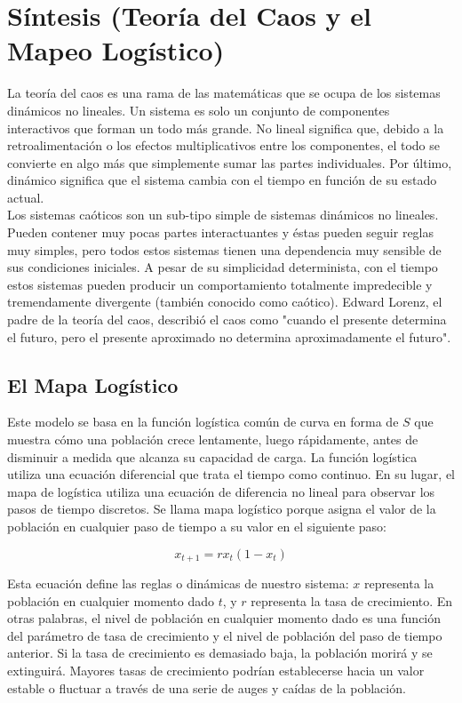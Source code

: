 \documentclass[12pt]{article}
\begin{document}
\section*{Síntesis (Teoría del Caos y el Mapeo Logístico)}

La teoría del caos es una rama de las matemáticas que se ocupa de los sistemas dinámicos no lineales. Un sistema es solo un conjunto de componentes interactivos que forman un todo más grande. No lineal significa que, debido a la retroalimentación o los efectos multiplicativos entre los componentes, el todo se convierte en algo más que simplemente sumar las partes individuales. Por último, dinámico significa que el sistema cambia con el tiempo en función de su estado actual.\\

Los sistemas caóticos son un sub-tipo simple de sistemas dinámicos no lineales. Pueden contener muy pocas partes interactuantes y éstas pueden seguir reglas muy simples, pero todos estos sistemas tienen una dependencia muy sensible de sus condiciones iniciales. A pesar de su simplicidad determinista, con el tiempo estos sistemas pueden producir un comportamiento totalmente impredecible y tremendamente divergente (también conocido como caótico). Edward Lorenz, el padre de la teoría del caos,  describió el caos como "cuando el presente determina el futuro, pero el presente aproximado no determina aproximadamente el futuro".

\subsection*{El Mapa Logístico}

Este modelo se basa en la función logística común de curva en forma de $S$  que muestra cómo una población crece lentamente, luego rápidamente, antes de disminuir a medida que alcanza su capacidad de carga. La función logística utiliza una ecuación diferencial que trata el tiempo como continuo. En su lugar, el mapa de logística utiliza una ecuación de diferencia no lineal para observar los pasos de tiempo discretos. Se llama mapa logístico  porque asigna el valor de la población en cualquier paso de tiempo a su valor en el siguiente paso:

$$x_{t+1}=rx_t(1-x_t)$$

Esta ecuación define las reglas o dinámicas de nuestro sistema: $x$ representa la población en cualquier momento dado  $t$, y $r$ representa la tasa de crecimiento. En otras palabras, el nivel de población en cualquier momento dado es una función del parámetro de tasa de crecimiento y el nivel de población del paso de tiempo anterior. Si la tasa de crecimiento es demasiado baja, la población morirá y se extinguirá. Mayores tasas de crecimiento podrían establecerse hacia un valor estable o fluctuar a través de una serie de auges y caídas de la población.
\end{document}
